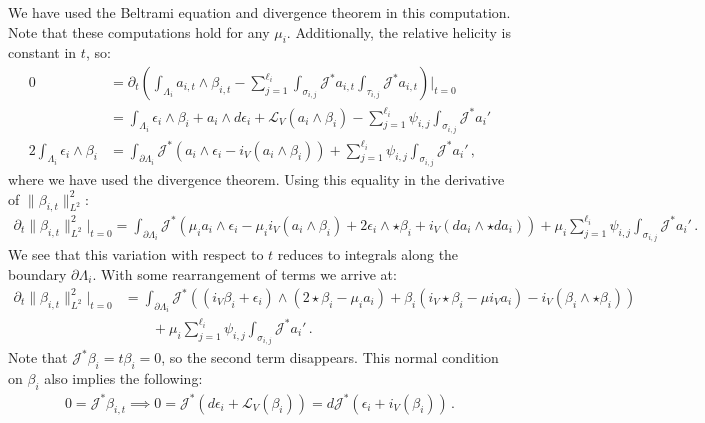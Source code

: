 \documentclass[11pt]{article}
\theoremstyle{plain}
\theoremstyle{definition}
\theoremstyle{remark}
\newcommand{\ST}{\Lambda}
\begin{document}
We have used the Beltrami equation and divergence theorem in this computation. Note that these computations hold for any \(\mu_i \). Additionally, the relative helicity is constant in \(t\), so:
\begin{align*}
    0 & = \partial_t  \left( \int_{\ST_i} a_{i,t} \wedge \beta_{i,t}  - \sum_{j=1}^{\ell_i} \int_{\sigma_{i,j}} \mathcal{J}^* a_{i,t} \int_{\tau_{i,j}} \mathcal{J}^* a_{i,t}  \right) \Bigg|_{t=0}\\
    & =  \int_{\ST_i} \epsilon_i \wedge\beta_i + a_i \wedge d \epsilon_i + \mathcal{L}_V(a_i \wedge\beta_i) - \sum_{j=1}^{\ell_i} \psi_{i,j}  \int_{\sigma_{i,j}} \mathcal{J}^* a_i'    \\ 
     2 \int_{\ST_i}   \epsilon_i \wedge\beta_i & =  \int_{\partial \ST_i} \mathcal{J}^* (  a_i \wedge \epsilon_i -   i_V(a_i \wedge\beta_i) ) + \sum_{j=1}^{\ell_i} \psi_{i,j}  \int_{\sigma_{i,j}} \mathcal{J}^* a_i' \, , 
\end{align*}
where we have used the divergence theorem. Using this equality in the derivative of \(\| \beta_{i,t}\|_{L^2}^2\):
\begin{align*}
    \partial_t    \big\| \beta_{i,t}\big\|_{L^2}^2    \Big|_{t=0}  \!  =   \int_{\partial \ST_i}  \! \! \mathcal{J}^* ( \mu_i a_i \wedge \epsilon_i -   \mu_i i_V(a_i \wedge\beta_i)   +    2 \epsilon_i \wedge \star\beta_i +  i_V (da_i \wedge \star da_i) ) + \mu_i \sum_{j=1}^{\ell_i} \psi_{i,j}  \int_{\sigma_{i,j}} \! \! \mathcal{J}^* a_i' \, .
\end{align*}
We see that this variation with respect to \(t\) reduces to integrals along the boundary \(\partial \ST_i\). With some rearrangement of terms we arrive at:
\begin{align*}
    \partial_t    \big\| \beta_{i,t}\big\|_{L^2}^2    \Big|_{t=0}  & =   \int_{\partial \ST_i} \mathcal{J}^* (   (i_V\beta_i + \epsilon_i ) \wedge ( 2 \star\beta_i - \mu_i a_i) +\beta_i (i_V \star\beta_i - \mu i_V a_i) - i_V( \beta_i \wedge \star \beta_i) ) \\ & \qquad  + \mu_i \sum_{j=1}^{\ell_i} \psi_{i,j}  \int_{\sigma_{i,j}} \mathcal{J}^* a_i' \, .
\end{align*}
Note that \(\mathcal{J}^* \beta_i = t \beta_i = 0\), so the second term disappears. This normal condition on \(\beta_i\) also implies the following:
\begin{align*}
    0 = \mathcal{J}^* \beta_{i,t} \implies 0 = \mathcal{J}^* (d \epsilon_i  + \mathcal{L}_V(\beta_i) ) = d \mathcal{J}^* ( \epsilon_i  + i_V(\beta_i) )  \, . 
\end{align*}
\end{document}
